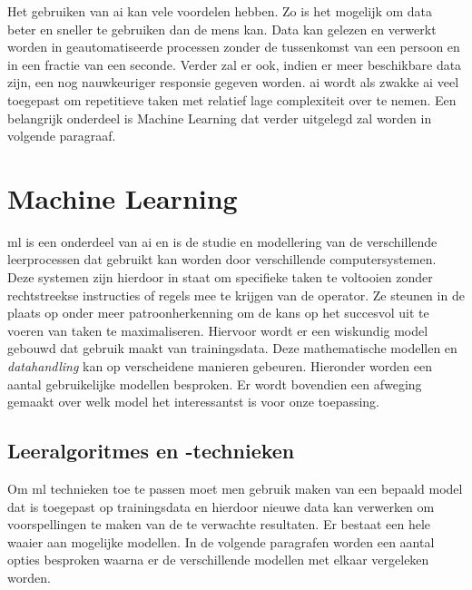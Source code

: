 Het gebruiken van \gls{ai} kan vele voordelen hebben\cite{frankwatching}\cite{SAS}. Zo is het mogelijk om data beter en sneller te gebruiken dan de mens kan. Data kan gelezen en verwerkt worden in geautomatiseerde processen zonder de tussenkomst van een persoon en in een fractie van een seconde. Verder zal er ook, indien er meer beschikbare data zijn, een nog nauwkeuriger responsie gegeven worden. \gls{ai} wordt als zwakke \gls{ai} veel toegepast om repetitieve taken met relatief lage complexiteit over te nemen. Een belangrijk onderdeel is Machine Learning dat verder uitgelegd zal worden in volgende paragraaf.




\newpage

\section{Machine Learning}
\gls{ml} is een onderdeel van \gls{ai} en is de studie en modellering van de verschillende leerprocessen dat gebruikt kan worden door verschillende computersystemen\cite{carbonell1983overview}. Deze systemen zijn hierdoor in staat om specifieke taken te voltooien zonder rechtstreekse instructies of regels mee te krijgen van de operator. Ze steunen in de plaats op onder meer patroonherkenning om de kans op het succesvol uit te voeren van taken te maximaliseren. Hiervoor wordt er een wiskundig model gebouwd dat gebruik maakt van trainingsdata. Deze mathematische modellen en \textit{datahandling} kan op verscheidene manieren gebeuren. Hieronder worden een aantal gebruikelijke modellen besproken. Er wordt bovendien een afweging gemaakt over welk model het interessantst is voor onze toepassing. 

	\subsection{Leeralgoritmes en -technieken}
	Om \gls{ml} technieken toe te passen moet men gebruik maken van een bepaald model dat is toegepast op trainingsdata en hierdoor nieuwe data kan verwerken om voorspellingen te maken van de te verwachte resultaten. Er bestaat een hele waaier aan mogelijke modellen. In de volgende paragrafen worden een aantal opties besproken waarna er de verschillende modellen met elkaar vergeleken worden.
	
